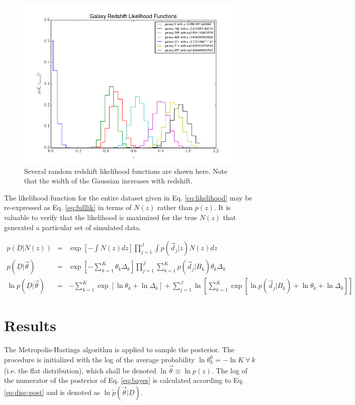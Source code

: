 \documentclass[12pt, onecolumn]{emulateapj}
\newcommand{\textul}{\underline}
\begin{document}
\begin{figure}
\label{fig:pzs}
\includegraphics[scale=0.5]{lik-samps.png}
\caption{Several random redshift likelihood functions are shown here.  Note that the width of the Gaussian increases with redshift.}
\end{figure}

The likelihood function for the entire dataset given in Eq. \ref{eq:likelihood} may be re-expressed as Eq. \ref{eq:fulllik} in terms of $N(z)$ rather than $p(z)$.  It is valuable to verify that the likelihood is maximized for the true $N(z)$ that generated a particular set of simulated data.

\begin{eqnarray}
\label{eq:fulllik}
p(\textul{D}|N(z)) &=& \exp\left[-\int N(z)dz\right] \prod_{j=1}^{J}\int p(\vec{d}_{j}|z)N(z)dz\\
p(\textul{D}|\vec{\theta}) &=& \exp\left[-\sum_{k=1}^{K}\theta_{k}\Delta_{k}\right] \prod_{j=1}^{J}\sum_{k=1}^{K} p(\vec{d}_{j}|B_{k})\theta_{k}\Delta_{k} \nonumber\\
\ln p(\textul{D}|\vec{\theta}) &=& -\sum_{k=1}^{K}\exp\left[\ln\theta_{k}+\ln\Delta_{k}\right]+\sum_{j=1}^{J}\ln\left[\sum_{k=1}^{K}\exp\left[\ln p(\vec{d}_{j}|B_{k})+\ln\theta_{k}+\ln\Delta_{k}\right]\right] \nonumber
\end{eqnarray}

\section{Results}

The Metropolis-Hastings algorithm is applied to sample the posterior.  The procedure is initialized with the log of the average probability $\ln\theta^{0}_{k}=-\ln K\ \forall\ k$ (i.e. the flat distribution), which shall be denoted $\ln\vec{\theta}\equiv\ln p(z)$.  The log of the numerator of the posterior of Eq. \ref{eq:bayes} is calculated according to Eq. \ref{eq:disc-post} and is denoted as $\ln\tilde{p}(\vec{\theta}|\textul{D})$.  
\end{document}
